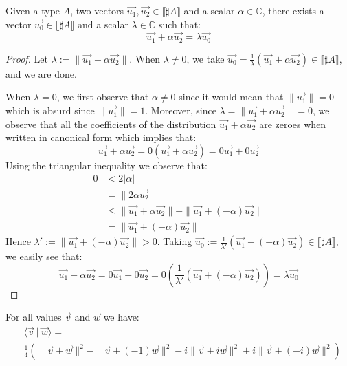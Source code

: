 \documentclass[runningheads,orivec,envcountsame,envcountsect]{llncs}
\def\C{\mathbb{C}}            %
\def\scal#1#2{\langle{#1}~|~{#2}\rangle}
\def\sem#1{\llbracket#1\rrbracket}
\begin{document}
\begin{lemma}\label{lem:VecRewrite}%
Given a type $A$, two vectors $\vec{u_1},\vec{u_2}\in\sem{\sharp A}$ and a scalar $\alpha\in\C$, there exists a vector $\vec{u_0}\in\sem{\sharp A}$ and a scalar $\lambda\in\C$ such that:
\[
\vec{u_1} + \alpha\vec{u_2} = \lambda \vec{u_0} 
\]
\end{lemma}
\begin{proof}
    Let $\lambda:=\|\vec{u_1}+\alpha\vec{u_2}\|$. When $\lambda\neq 0$, we take $\vec{u_0}=\frac{1}{\lambda}(\vec{u_1}+\alpha\vec{u_2})\in\sem{\sharp A}$, and we are done.

    When $\lambda=0$, we first observe that $\alpha\neq 0$ since it would mean that $\|\vec{u_1}\|=0$ which is absurd since $\|\vec{u_1}\|=1$. Moreover, since $\lambda=\|\vec{u_1}+\alpha\vec{u_2}\|=0$, we observe that all the coefficients of the distribution $\vec{u_1}+\alpha\vec{u_2}$ are zeroes when written in canonical form which implies that:
    \[
    \vec{u_1}+\alpha\vec{u_2} = 0(\vec{u_1}+\alpha\vec{u_2}) = 0\vec{u_1}+0\vec{u_2}
    \]
    Using the triangular inequality we observe that:
    \begin{align*}
    0 &< 2|\alpha|\\
    &= \|2\alpha\vec{u_2}\|\\
    &\leq\|\vec{u_1}+\alpha\vec{u_2}\| + \|\vec{u_1 }+ (-\alpha)\vec{u_2}\|\\
    &= \|\vec{u_1}+(-\alpha)\vec{u_2}\|
    \end{align*}
    Hence $\lambda' := \|\vec{u_1}+(-\alpha)\vec{u_2}\|>0$. Taking $\vec{u_0}:= \frac{1}{\lambda'}(\vec{u_1}+ (-\alpha)\vec{u_2})\in\sem{\sharp A}$, we easily see that:
    \[
    \vec{u_1}+\alpha\vec{u_2} = 0\vec{u_1} + 0\vec{u_2} = 0(\frac{1}{\lambda'} (\vec{u_1} + (-\alpha) \vec{u_2})) = \lambda \vec{u_0}
    \]
\end{proof}

\begin{theorem}\label{prop:Polarization} %
For all values $\vec{v}$ and $\vec{w}$ we have:
\begin{align*}
&\scal{\vec{v}}{\vec{w}}=\\
&\frac{1}{4} (\|\vec{v}+\vec{w}\|^2 - \|\vec{v} + (-1) \vec{w}\|^2 - i\|\vec{v} + i\vec{w}\|^2 + i\|\vec{v}+ (-i)\vec{w}\|^2)
\end{align*}
\end{theorem}
\end{document}
